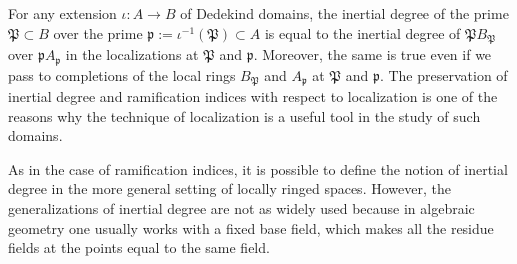 \documentclass[12pt]{article}
\newcommand{\p}{\mathfrak{p}}
\renewcommand{\P}{\mathfrak{P}}
\begin{document}
For any extension $\iota\colon A \to B$ of Dedekind domains, the inertial degree of the prime $\P \subset B$ over the prime $\p := \iota^{-1}(\P) \subset A$ is equal to the inertial degree of $\P B_\P$ over $\p A_\p$ in the localizations at $\P$ and $\p$. Moreover, the same is true even if we pass to completions of the local rings $B_\P$ and $A_\p$ at $\P$ and $\p$. The preservation of inertial degree and ramification indices with respect to localization is one of the reasons why the technique of localization is a useful tool in the study of such domains.

As in the case of ramification indices, it is possible to define the notion of inertial degree in the more general setting of locally ringed spaces. However, the generalizations of inertial degree are not as widely used because in algebraic geometry one usually works with a fixed base field, which makes all the residue fields at the points equal to the same field.
\end{document}
